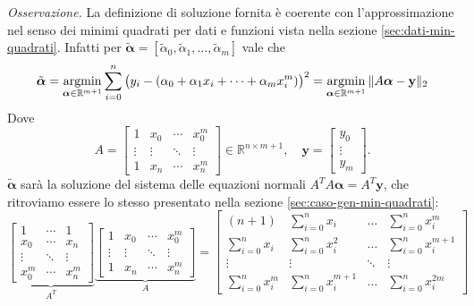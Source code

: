 \textit{Osservazione.} La definizione di soluzione fornita è coerente con l'approssimazione nel senso dei minimi quadrati per dati e funzioni vista nella sezione \ref{sec:dati-min-quadrati}. Infatti per $\tilde {\boldsymbol  \alpha} =[\tilde \alpha_0, \tilde \alpha_1, \dots,\tilde \alpha_m]$ vale che 
\[
\tilde {\boldsymbol{\alpha}}=\operatornamewithlimits{argmin}_{\boldsymbol \alpha \in\mathbb R^{m+1}}\sum_{i=0}^n\big (y_i-(\alpha_0+\alpha_1x_i+\dots+\alpha_mx_i^m)\big)^2=\operatornamewithlimits{argmin}_{\boldsymbol \alpha \in\mathbb R^{m+1}}\|A \boldsymbol \alpha -\mathbf y\|_2
\]
Dove
\[
    A=\begin{bmatrix}
        1&x_0&\cdots&x_0^m\\
        \vdots&\vdots&\ddots&\vdots\\
        1&x_n&\cdots&x_n^m
    \end{bmatrix}\in \mathbb R^{n\times m+1},\quad \mathbf y=\begin{bmatrix}
        y_0\\
        \vdots\\
        y_m
    \end{bmatrix}.
\]
$\tilde{\boldsymbol{\alpha}}$ sarà la soluzione del sistema delle equazioni normali $A^TA\boldsymbol{\alpha}=A^T\mathbf y$, che ritroviamo essere lo stesso presentato nella sezione \ref{sec:caso-gen-min-quadrati}:
\[
\underbrace{\begin{bmatrix}
        1 & \cdots & 1 \\
        x_0 & \cdots & x_n \\
        \vdots & \ddots & \vdots \\
        x_0^m & \cdots & x_n^m
    \end{bmatrix}}_{A^T}
    \underbrace{\begin{bmatrix}
        1&x_0&\cdots&x_0^m\\
        \vdots&\vdots&\ddots&\vdots\\
        1&x_n&\cdots&x_n^m
    \end{bmatrix}}_A=\begin{bmatrix}( n+1) & \sum ^{n}_{i=0} x_{i} & \dotsc  & \sum ^{n}_{i=0} x^{m}_{i}\\
\sum ^{n}_{i=0} x_{i} & \sum ^{n}_{i=0} x^{2}_{i} & \dotsc  & \sum ^{n}_{i=0} x^{m+1}_{i}\\
\vdots  & \vdots  & \ddots  & \vdots \\
\sum ^{n}_{i=0} x^{m}_{i} & \sum ^{n}_{i=0} x^{m+1}_{i} & \dotsc  & \sum ^{n}_{i=0} x^{2m}_{i}
\end{bmatrix}
\]
